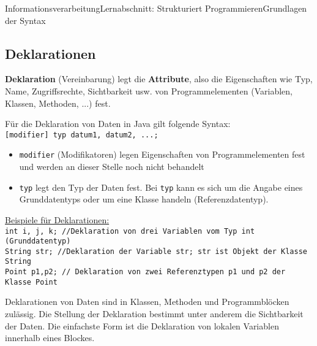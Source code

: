 \documentclass[11pt,oneside,openany,headings=optiontotoc,11pt,numbers=noenddot]{article}
\begin{document}
\begin{worksheet}{Informationsverarbeitung}{Lernabschnitt: Strukturiert Programmieren}{Grundlagen der Syntax}
		\subsection{Deklarationen}
		\textbf{Deklaration} (Vereinbarung) legt die \textbf{Attribute}, also die Eigenschaften wie Typ, Name, Zugriffsrechte, Sichtbarkeit usw. von Programmelementen (Variablen, Klassen, Methoden, ...) fest.\\
		\par\noindent
		Für die Deklaration von Daten in Java gilt folgende Syntax:\\
		\lstinline[style=Python]|[modifier] typ datum1, datum2, ...;|
		\begin{itemize}
			\item {\lstinline[style=Python]|modifier|} (Modifikatoren) legen Eigenschaften von Programmelementen fest und werden an dieser Stelle noch nicht behandelt
			\item {\lstinline[style=Python]|typ|} legt den Typ der Daten fest. Bei {\lstinline[style=Python]|typ|} kann es sich um die Angabe eines Grunddatentyps oder um eine Klasse handeln (Referenzdatentyp).
		\end{itemize}
		\underline{Beispiele für Deklarationen:}\\
		\lstinline[style=Python]|int i, j, k; //Deklaration von drei Variablen vom Typ int (Grunddatentyp)|\\
		\lstinline[style=Python]|String str; //Deklaration der Variable str; str ist Objekt der Klasse String|\\
		\lstinline[style=Python]|Point p1,p2; // Deklaration von zwei Referenztypen p1 und p2 der Klasse Point|\\
		\par\noindent
		Deklarationen von Daten sind in Klassen, Methoden und Programmblöcken zulässig. Die Stellung der Deklaration bestimmt unter anderem die Sichtbarkeit der Daten. Die einfachste Form ist die Deklaration von lokalen Variablen innerhalb eines Blockes.
		

\end{worksheet}
\end{document}
